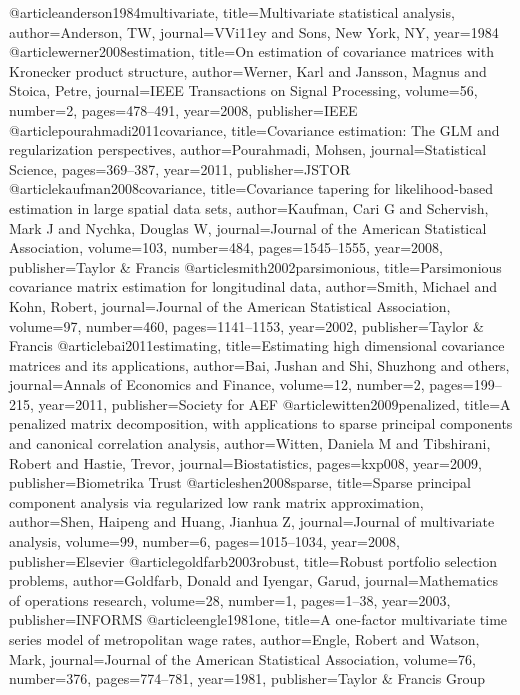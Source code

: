 @article{anderson1984multivariate,
  title={Multivariate statistical analysis},
  author={Anderson, TW},
  journal={VVi11ey and Sons, New York, NY},
  year={1984}
}
@article{werner2008estimation,
  title={On estimation of covariance matrices with Kronecker product structure},
  author={Werner, Karl and Jansson, Magnus and Stoica, Petre},
  journal={IEEE Transactions on Signal Processing},
  volume={56},
  number={2},
  pages={478--491},
  year={2008},
  publisher={IEEE}
}
@article{pourahmadi2011covariance,
  title={Covariance estimation: The GLM and regularization perspectives},
  author={Pourahmadi, Mohsen},
  journal={Statistical Science},
  pages={369--387},
  year={2011},
  publisher={JSTOR}
}
@article{kaufman2008covariance,
  title={Covariance tapering for likelihood-based estimation in large spatial data sets},
  author={Kaufman, Cari G and Schervish, Mark J and Nychka, Douglas W},
  journal={Journal of the American Statistical Association},
  volume={103},
  number={484},
  pages={1545--1555},
  year={2008},
  publisher={Taylor \& Francis}
}
@article{smith2002parsimonious,
  title={Parsimonious covariance matrix estimation for longitudinal data},
  author={Smith, Michael and Kohn, Robert},
  journal={Journal of the American Statistical Association},
  volume={97},
  number={460},
  pages={1141--1153},
  year={2002},
  publisher={Taylor \& Francis}
}
@article{bai2011estimating,
  title={Estimating high dimensional covariance matrices and its applications},
  author={Bai, Jushan and Shi, Shuzhong and others},
  journal={Annals of Economics and Finance},
  volume={12},
  number={2},
  pages={199--215},
  year={2011},
  publisher={Society for AEF}
}
@article{witten2009penalized,
  title={A penalized matrix decomposition, with applications to sparse principal components and canonical correlation analysis},
  author={Witten, Daniela M and Tibshirani, Robert and Hastie, Trevor},
  journal={Biostatistics},
  pages={kxp008},
  year={2009},
  publisher={Biometrika Trust}
}
@article{shen2008sparse,
  title={Sparse principal component analysis via regularized low rank matrix approximation},
  author={Shen, Haipeng and Huang, Jianhua Z},
  journal={Journal of multivariate analysis},
  volume={99},
  number={6},
  pages={1015--1034},
  year={2008},
  publisher={Elsevier}
}
@article{goldfarb2003robust,
  title={Robust portfolio selection problems},
  author={Goldfarb, Donald and Iyengar, Garud},
  journal={Mathematics of operations research},
  volume={28},
  number={1},
  pages={1--38},
  year={2003},
  publisher={INFORMS}
}
@article{engle1981one,
  title={A one-factor multivariate time series model of metropolitan wage rates},
  author={Engle, Robert and Watson, Mark},
  journal={Journal of the American Statistical Association},
  volume={76},
  number={376},
  pages={774--781},
  year={1981},
  publisher={Taylor \& Francis Group}
}
